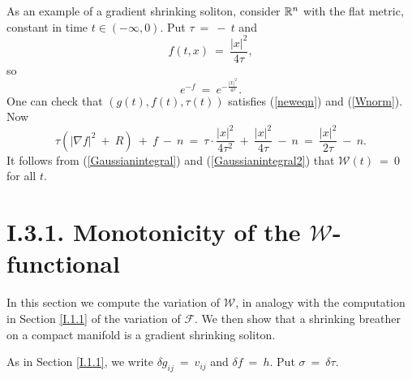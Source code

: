 As an example of a gradient shrinking soliton,
consider ${\mathbb R}^n$ with the flat metric, constant in time
$t \in (-\infty, 0)$. Put $\tau \: = \: - \: t$ and
\begin{equation}
f(t, x) \: = \: \frac{|x|^2}{4\tau},
\end{equation}
so
\begin{equation}
e^{-f} \: = \: e^{- \frac{|x|^2}{4\tau}}.
\end{equation}
One can check that $(g(t), f(t), \tau(t))$ satisfies
(\ref{neweqn}) and (\ref{Wnorm}).
Now
\begin{equation}
\tau ( |\nabla f|^2 \: + \: R) \: + \: f \: - \: n \: = \:
\tau \cdot \frac{|x|^2}{4 \tau^2} \: + \: \frac{|x|^2}{4\tau} \: - \: n
\: = \:  \frac{|x|^2}{2\tau} \: - \: n.
\end{equation}
It follows from (\ref{Gaussianintegral}) and (\ref{Gaussianintegral2})
that ${\mathcal W}(t) \: = \: 0$ for all $t$.

\section{I.3.1. Monotonicity of the ${\mathcal W}$-functional}

In this section
we compute the variation of ${\mathcal W}$, in analogy with
the computation in Section \ref{I.1.1} of the variation of ${\mathcal F}$.
We then show that a shrinking breather on a compact manifold
is a gradient shrinking soliton.

As in Section \ref{I.1.1}, we write $\delta g_{ij} \: = \: v_{ij}$ and $\delta f \: = \: h$.
Put $\sigma \: = \: \delta \tau$.

